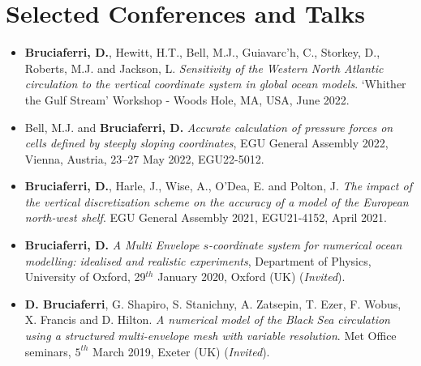 \documentclass[a4paper, oneside, final]{scrartcl}
\begin{document}
\section{Selected Conferences and Talks}
\noindent
\normalsize
\begin{itemize}
\item \textbf{Bruciaferri, D.}, Hewitt, H.T., Bell, M.J., Guiavarc'h, C., Storkey, D., Roberts, M.J. and Jackson, L. \textit{Sensitivity of the Western North Atlantic circulation to the vertical coordinate system in global ocean models}. `Whither the Gulf Stream' Workshop - Woods Hole, MA, USA, June 2022.
\item Bell, M.J. and \textbf{Bruciaferri, D.} \textit{Accurate calculation of pressure forces on cells defined by steeply sloping coordinates}, EGU General Assembly 2022, Vienna, Austria, 23–27 May 2022, EGU22-5012. 
\item \textbf{Bruciaferri, D.}, Harle, J., Wise, A., O'Dea, E. and Polton, J.  \textit{The impact of the vertical discretization scheme on the accuracy of a model of the European north-west shelf}. EGU General Assembly 2021, EGU21-4152, April 2021.
\item \textbf{Bruciaferri, D.} \textit{A Multi Envelope $s$-coordinate system for numerical ocean modelling: idealised and realistic experiments}, Department of Physics, University of Oxford, 29$^{th}$ January 2020, Oxford (UK) (\textit{Invited}). 
\item \textbf{D. Bruciaferri}, G. Shapiro, S. Stanichny, A. Zatsepin, T. Ezer, F. Wobus, X. Francis and D. Hilton. \textit{A numerical model of the Black Sea circulation using a structured multi-envelope mesh with variable resolution}. Met Office seminars, $5^{th}$ March 2019, Exeter (UK) (\textit{Invited}).

\end{itemize}
\end{document}
